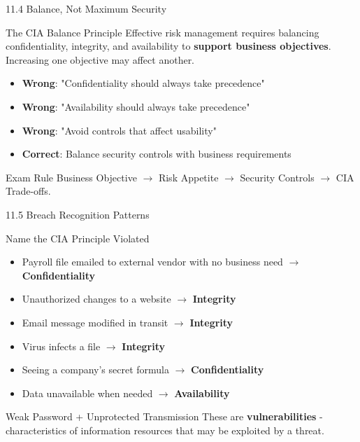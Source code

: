 \documentclass{beamer}
\begin{document}
	\begin{frame}{11.4 Balance, Not Maximum Security}
		\begin{block}{The CIA Balance Principle}
			Effective risk management requires balancing confidentiality, integrity, and availability to \textbf{support business objectives}. Increasing one objective may affect another.
		\end{block}
		
		\begin{itemize}
			\item \textbf{Wrong}: "Confidentiality should always take precedence"
			\item \textbf{Wrong}: "Availability should always take precedence"
			\item \textbf{Wrong}: "Avoid controls that affect usability"
			\item \textbf{Correct}: Balance security controls with business requirements
		\end{itemize}
		
		\begin{exampleblock}{Exam Rule}
			Business Objective $\rightarrow$ Risk Appetite $\rightarrow$ Security Controls $\rightarrow$ CIA Trade-offs.
		\end{exampleblock}
	\end{frame}
	
	\begin{frame}{11.5 Breach Recognition Patterns}
		\begin{block}{Name the CIA Principle Violated}
			\begin{itemize}
				\item Payroll file emailed to external vendor with no business need $\rightarrow$ \textbf{Confidentiality}
				\item Unauthorized changes to a website $\rightarrow$ \textbf{Integrity}
				\item Email message modified in transit $\rightarrow$ \textbf{Integrity}
				\item Virus infects a file $\rightarrow$ \textbf{Integrity}
				\item Seeing a company's secret formula $\rightarrow$ \textbf{Confidentiality}
				\item Data unavailable when needed $\rightarrow$ \textbf{Availability}
			\end{itemize}
		\end{block}
		
		\begin{alertblock}{Weak Password + Unprotected Transmission}
			These are \textbf{vulnerabilities} - characteristics of information resources that may be exploited by a threat.
		\end{alertblock}
	\end{frame}
	
\end{document}
